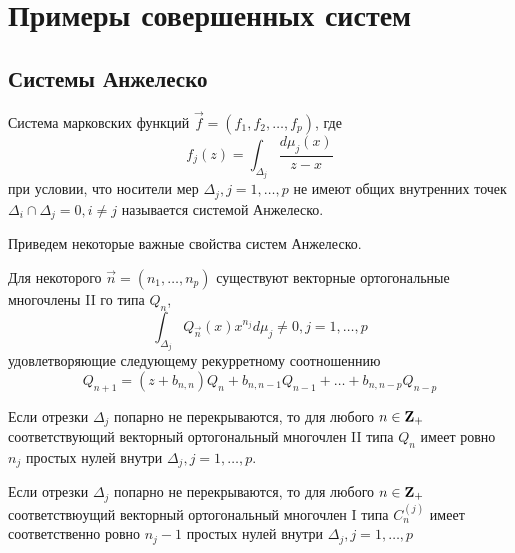 \section{Примеры совершенных систем}
\subsection{Системы Анжелеско}
\begin{defi}
Система марковских функций
$\overrightarrow{f}=(f_1,f_2,\ldots,f_p)$, где
$$
 f_j(z)
=\int_{\Delta_j}{\displaystyle\frac{d\mu_j(x)}{z-x}}
$$
при условии, что носители мер ${\Delta_j},j=1,\ldots,p$ не имеют
общих внутренних точек ${\Delta_i}\cap{\Delta_j} = 0, i\not=j $
называется системой Анжелеско.
\end{defi}
Приведем некоторые важные свойства систем Анжелеско.
\begin{prope}Для некоторого $\overrightarrow{n}=(n_1,\ldots, n_p)$ существуют векторные
ортогональные многочлены II го типа $Q_n$,
$$
\int_{\Delta_j} {Q_{\overrightarrow{n}}(x)x^{n_j}d\mu_j} \not=0,
j=1,\ldots,p
$$
удовлетворяющие следующему рекурретному соотношеннию
$$
Q_{n+1}=(z+b_{n,n})Q_n+b_{n,n-1}Q_{n-1}+\ldots+b_{n,n-p}Q_{n-p}
$$
\end{prope}

\begin{prope}
\label{prope_3.1} Если отрезки ${\Delta_j}$ попарно не
перекрываются, то для любого $n \in \bf Z \rm _{+}$
соответствующий векторный ортогональный многочлен II типа $Q_n$
имеет ровно $n_j$ простых нулей внутри $\Delta_j, j=1,\ldots,p$.
\end{prope}

\begin{prope}
Если отрезки ${\Delta_j}$ попарно не перекрываются, то для любого
$n \in \bf Z \rm _{+}$ соответствюущий векторный ортогональный
многочлен I типа $ C^{(j)}_n $ имеет соответственно ровно $n_j-1$
простых нулей внутри $\Delta_j, j=1,\ldots,p$
\end{prope}

